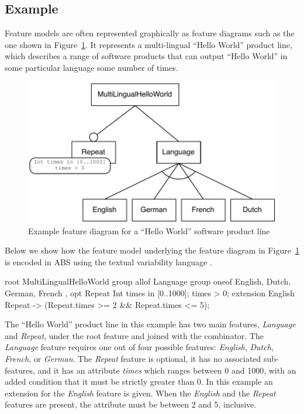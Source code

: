 \subsection{Example}
\label{sec:feature model example}
Feature models are often represented graphically as feature diagrams such as the
one shown in Figure~\ref{fig:feature diagram}.  It represents a multi-lingual
``Hello World'' product line, which describes a range of software products that
can output ``Hello World'' in some particular language some number of times.
\begin{figure}[ht]
    \centering \includegraphics[width=.6\linewidth]{fig/featurediagram}
    \caption{Example feature diagram for a ``Hello World'' software product line}
    \label{fig:feature diagram}
\end{figure}
%
Below we show how the feature model underlying the feature diagram in
Figure~\ref{fig:feature diagram} is encoded in ABS using the textual variability
language \muTVL.
\begin{abscode}
root MultiLingualHelloWorld {
  group allof {
    Language {
      group oneof { English, Dutch, German, French }  
    },
    opt Repeat {
      Int times in [0..1000];
      times > 0; 
    }
  } 
}
extension English {
  Repeat -> (Repeat.times >= 2 && Repeat.times <= 5);
}
\end{abscode}

The ``Hello World'' product line in this example has two main features,
\emph{Language} and \emph{Repeat}, under the root feature and joined with the
 combinator. The \emph{Language} feature requires one out of
four possible features: \emph{English}, \emph{Dutch}, \emph{French}, or
\emph{German}. The \emph{Repeat} feature is optional, it has no associated
sub-features, and it has an attribute \emph{times} which ranges between 0 and
1000, with an added condition that it must be strictly greater than 0. In this
example an extension for the \emph{English} feature is given. When the
\emph{English} and the \emph{Repeat} features are present, the attribute
 must be between 2 and 5, inclusive.


